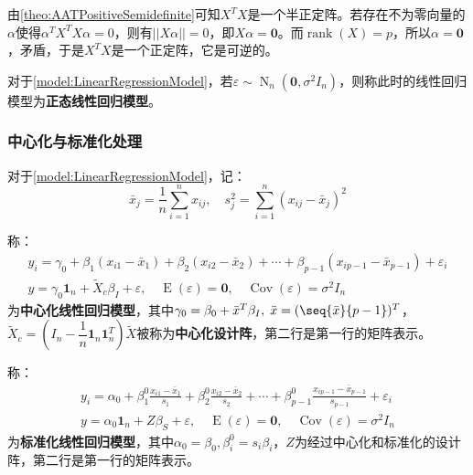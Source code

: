 \begin{derivation}
	由\cref{theo:AATPositiveSemidefinite}可知$X^TX$是一个半正定阵。若存在不为零向量的$\alpha$使得$\alpha^TX^TX\alpha=0$，则有$||X\alpha||=0$，即$X\alpha=\mathbf{0}$。而$\operatorname{rank}(X)=p$，所以$\alpha=\mathbf{0}$，矛盾，于是$X^TX$是一个正定阵，它是可逆的。
\end{derivation}
\begin{definition}\label{model:NormalLinearRegressionModel}
	对于\cref{model:LinearRegressionModel}，若$\varepsilon\sim\operatorname{N}_n(\mathbf{0},\sigma^2I_n)$，则称此时的线性回归模型为\textbf{正态线性回归模型}。
\end{definition}
\subsubsection{中心化与标准化处理}
\begin{definition}
	对于\cref{model:LinearRegressionModel}，记：
	\begin{equation*}
		\bar{x}_j=\frac{1}{n}\sum_{i=1}^{n}x_{ij},\quad s_j^2=\sum_{i=1}^{n}(x_{ij}-\bar{x}_j)^2
	\end{equation*}\par
	称：
	\begin{gather*}
		y_i=\gamma_0+\beta_1(x_{i1}-\bar{x}_1)+\beta_2(x_{i2}-\bar{x}_2)+\cdots+\beta_{p-1}(x_{ip-1}-\bar{x}_{p-1})+\varepsilon_i \\
		y=\gamma_0\mathbf{1}_n+\tilde{X}_c\beta_I+\varepsilon,\quad\operatorname{E}(\varepsilon)=\mathbf{0},\quad\operatorname{Cov}(\varepsilon)=\sigma^2I_n
	\end{gather*}
	为\textbf{中心化线性回归模型}，其中$\gamma_0=\beta_0+\bar{x}^T\beta_I,\;\bar{x}=(\seq{\bar{x}}{p-1})^T$，$\tilde{X}_c=\left(I_n-\dfrac{1}{n}\mathbf{1}_n\mathbf{1}_n^T\right)\tilde{X}$被称为\textbf{中心化设计阵}，第二行是第一行的矩阵表示。\par
	称：
	\begin{gather*}
		y_i=\alpha_0+\beta_1^0\frac{x_{i1}-\bar{x}_1}{s_1}+\beta_2^0\frac{x_{i2}-\bar{x}_2}{s_2}+\cdots+\beta^0_{p-1}\frac{x_{ip-1}-\bar{x}_{p-1}}{s_{p-1}}+\varepsilon_i \\
		y=\alpha_0\mathbf{1}_n+Z\beta_S+\varepsilon,\quad\operatorname{E}(\varepsilon)=\mathbf{0},\quad\operatorname{Cov}(\varepsilon)=\sigma^2I_n
	\end{gather*}
	为\textbf{标准化线性回归模型}，其中$\alpha_0=\beta_0,\beta_i^0=s_i\beta_i$，$Z$为经过中心化和标准化的设计阵，第二行是第一行的矩阵表示。
\end{definition}
